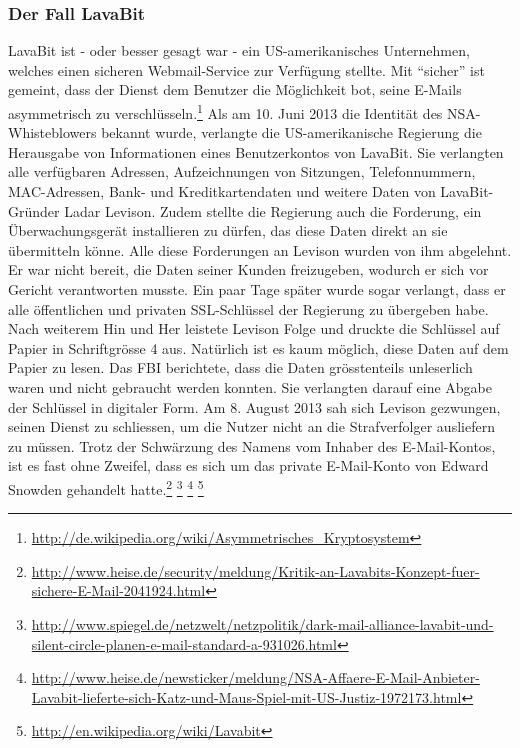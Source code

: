 \subsubsection{Der Fall LavaBit}
LavaBit ist - oder besser gesagt war - ein US-amerikanisches Unternehmen, welches einen sicheren Webmail-Service zur Verfügung stellte.
Mit ``sicher'' ist gemeint, dass der Dienst dem Benutzer die Möglichkeit bot, seine E-Mails asymmetrisch zu verschlüsseln.\footnote{\url{http://de.wikipedia.org/wiki/Asymmetrisches_Kryptosystem}}
Als am 10. Juni 2013 die Identität des NSA-Whisteblowers bekannt wurde, verlangte die US-amerikanische Regierung die Herausgabe von Informationen eines Benutzerkontos von LavaBit.
Sie verlangten alle verfügbaren Adressen, Aufzeichnungen von Sitzungen, Telefonnummern, MAC-Adressen, Bank- und Kreditkartendaten und weitere Daten von LavaBit-Gründer Ladar Levison. Zudem stellte die Regierung auch die Forderung, ein Überwachungsgerät installieren zu dürfen, das diese Daten direkt an sie übermitteln könne. Alle diese Forderungen an Levison wurden von ihm abgelehnt. Er war nicht bereit, die Daten seiner Kunden freizugeben, wodurch er sich vor Gericht verantworten musste.
Ein paar Tage später wurde sogar verlangt, dass er alle öffentlichen und privaten SSL-Schlüssel der Regierung zu übergeben habe. Nach weiterem Hin und Her leistete Levison Folge und druckte die Schlüssel auf Papier in Schriftgrösse 4 aus. Natürlich ist es kaum möglich, diese Daten auf dem Papier zu lesen. Das FBI berichtete, dass die Daten grösstenteils unleserlich waren und nicht gebraucht werden konnten. Sie verlangten darauf eine Abgabe der Schlüssel in digitaler Form.
Am 8. August 2013 sah sich Levison gezwungen, seinen Dienst zu schliessen, um die Nutzer nicht an die Strafverfolger ausliefern zu müssen.
Trotz der Schwärzung des Namens vom Inhaber des E-Mail-Kontos, ist es fast ohne Zweifel, dass es sich um das private E-Mail-Konto von Edward Snowden gehandelt hatte.\footnote{\url{http://www.heise.de/security/meldung/Kritik-an-Lavabits-Konzept-fuer-sichere-E-Mail-2041924.html}}
\footnote{\url{http://www.spiegel.de/netzwelt/netzpolitik/dark-mail-alliance-lavabit-und-silent-circle-planen-e-mail-standard-a-931026.html}}
\footnote{\url{http://www.heise.de/newsticker/meldung/NSA-Affaere-E-Mail-Anbieter-Lavabit-lieferte-sich-Katz-und-Maus-Spiel-mit-US-Justiz-1972173.html}}
\footnote{\url{http://en.wikipedia.org/wiki/Lavabit}}

